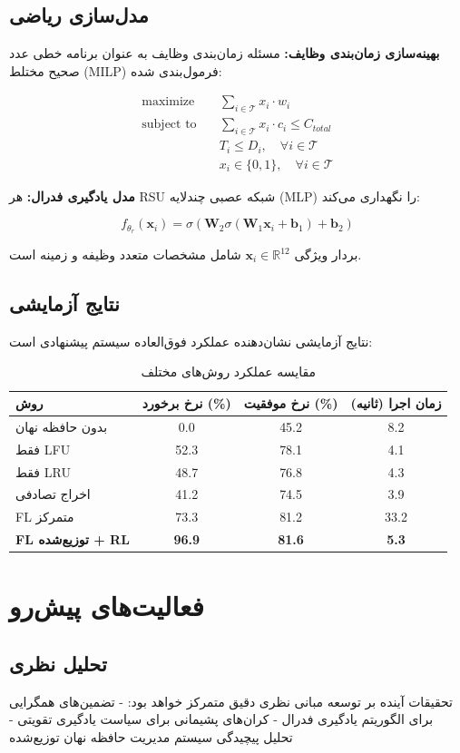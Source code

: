 \documentclass[11pt]{article}
\newcommand{\فصل}[1]{\section{#1}}
\newcommand{\قسمت}[1]{\subsection{#1}}
\begin{document}
\قسمت{مدل‌سازی ریاضی}

\textbf{بهینه‌سازی زمان‌بندی وظایف:}
مسئله زمان‌بندی وظایف به عنوان برنامه خطی عدد صحیح مختلط (MILP) فرمول‌بندی شده:

\begin{align}
\text{maximize} \quad & \sum_{i \in \mathcal{T}} x_i \cdot w_i \\
\text{subject to} \quad & \sum_{i \in \mathcal{T}} x_i \cdot c_i \leq C_{total} \\
& T_i \leq D_i, \quad \forall i \in \mathcal{T} \\
& x_i \in \{0, 1\}, \quad \forall i \in \mathcal{T}
\end{align}

\textbf{مدل یادگیری فدرال:}
هر RSU شبکه عصبی چندلایه (MLP) را نگهداری می‌کند:

\begin{equation}
f_{\theta_r}(\mathbf{x}_i) = \sigma(\mathbf{W}_2 \sigma(\mathbf{W}_1 \mathbf{x}_i + \mathbf{b}_1) + \mathbf{b}_2)
\end{equation}

بردار ویژگی $\mathbf{x}_i \in \mathbb{R}^{12}$ شامل مشخصات متعدد وظیفه و زمینه است.

\قسمت{نتایج آزمایشی}

نتایج آزمایشی نشان‌دهنده عملکرد فوق‌العاده سیستم پیشنهادی است:

\begin{table}[h]
\centering
\begin{tabular}{@{}lccc@{}}
\toprule
روش & نرخ برخورد (\%) & نرخ موفقیت (\%) & زمان اجرا (ثانیه) \\
\midrule
بدون حافظه نهان & 0.0 & 45.2 & 8.2 \\
فقط LFU & 52.3 & 78.1 & 4.1 \\
فقط LRU & 48.7 & 76.8 & 4.3 \\
اخراج تصادفی & 41.2 & 74.5 & 3.9 \\
FL متمرکز & 73.3 & 81.2 & 33.2 \\
\textbf{FL توزیع‌شده + RL} & \textbf{96.9} & \textbf{81.6} & \textbf{5.3} \\
\bottomrule
\end{tabular}
\caption{مقایسه عملکرد روش‌های مختلف}
\end{table}

\فصل{فعالیت‌های پیش‌رو}

\قسمت{تحلیل نظری}

تحقیقات آینده بر توسعه مبانی نظری دقیق متمرکز خواهد بود:
- تضمین‌های همگرایی برای الگوریتم یادگیری فدرال
- کران‌های پشیمانی برای سیاست یادگیری تقویتی
- تحلیل پیچیدگی سیستم مدیریت حافظه نهان توزیع‌شده
\end{document}
